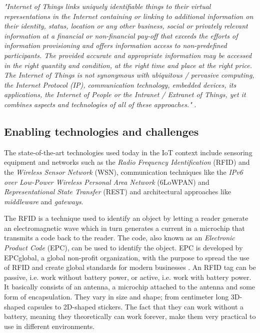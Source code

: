 \begin{center}
\textit{"Internet of Things links
uniquely identifiable things to their virtual representations in the Internet
containing or linking to additional information on their identity, status,
location or any other business, social or privately relevant information at a
financial or non-financial pay-off that exceeds the efforts of information
provisioning and offers information access to non-predefined participants. The
provided accurate and appropriate information may be accessed in the right
quantity and condition, at the right time and place at the right price. The
Internet of Things is not synonymous with ubiquitous / pervasive computing, the
Internet Protocol (IP), communication technology, embedded devices, its
applications, the Internet of People or the Intranet / Extranet of Things, yet
it combines aspects and technologies of all of these approaches."}
\cite{uckelmann2011architectural}.
\end{center}

\subsection{Enabling technologies and challenges}

The state-of-the-art technologies used today in the IoT context include
sensoring equipment and networks such as the \textit{Radio Frequency
Identification} (RFID) and the \textit{Wireless Sensor Network} (WSN),
communication techniques like the \textit{IPv6 over Low-Power Wireless Personal
Area Network} (6LoWPAN) and \textit{Representational State Transfer} (REST) and
architectural approaches like \textit{middleware} and \textit{gateways}.

The RFID is a technique used to identify an object by letting a reader generate
an electromagnetic wave which in turn generates a current in a microchip that
transmits a code back to the reader. The code, also known as an
\textit{Electronic Product Code} (EPC), can be used to identify the object. EPC
is developed by EPCglobal, a global non-profit organization, with the purpose
to spread the use of RFID and create global standards for modern businesses
\cite{atzori2010internet}. An RFID tag can be passive, i.e. work without
battery power, or active, i.e. work with battery power. It basically consists
of an antenna, a microchip attached to the antenna and some form of
encapsulation. They vary in size and shape; from centimeter long 3D-shaped
capsules to 2D-shaped stickers. The fact that they can work without a battery,
meaning they theoretically can work forever, make them very practical to use in
different environments. \cite{want2006introduction}

